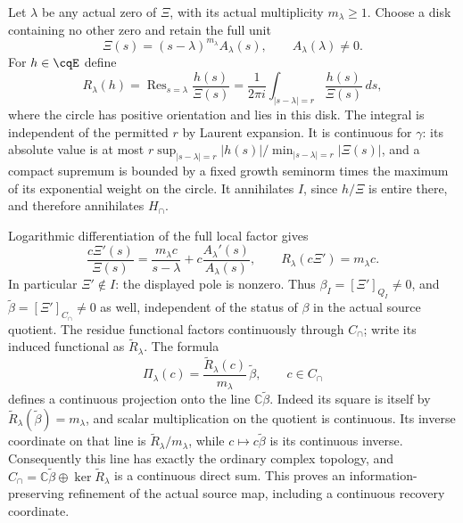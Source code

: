 Let $\lambda$ be any actual zero of $\Xi$, with its actual
multiplicity $m_\lambda\geq1$. Choose a disk containing no other zero
and retain the full unit
\[
 \Xi(s)=(s-\lambda)^{m_\lambda}A_\lambda(s),
 \qquad A_\lambda(\lambda)\ne0.
\]
For $h\in\cqE$ define
\begin{equation}
 R_\lambda(h)
 =\operatorname{Res}_{s=\lambda}\frac{h(s)}{\Xi(s)}
 =\frac1{2\pi i}\int_{|s-\lambda|=r}
                    \frac{h(s)}{\Xi(s)}\,ds ,
 \label{eq:cq-flow-residue-functional}
\end{equation}
where the circle has positive orientation and lies in this disk.
The integral is independent of the permitted $r$ by Laurent
expansion. It is continuous for $\gamma$: its absolute value is
at most $r\sup_{|s-\lambda|=r}|h(s)|/
\min_{|s-\lambda|=r}|\Xi(s)|$, and a compact supremum is bounded
by a fixed growth seminorm times the maximum of its exponential
weight on the circle. It annihilates $I$, since $h/\Xi$ is entire
there, and therefore annihilates $H_\cap$.

Logarithmic differentiation of the full local factor gives
\begin{equation}
 \frac{c\Xi'(s)}{\Xi(s)}
 =\frac{m_\lambda c}{s-\lambda}
        +c\frac{A_\lambda'(s)}{A_\lambda(s)},\qquad
 R_\lambda(c\Xi')=m_\lambda c .
 \label{eq:cq-flow-logarithmic-unit}
\end{equation}
In particular $\Xi'\notin I$: the displayed pole is nonzero.
Thus $\beta_I=[\Xi']_{Q_I}\ne0$, and
$\widetilde\beta=[\Xi']_{C_\cap}\ne0$ as well, independent of the
status of $\beta$ in the actual source quotient.
The residue functional factors continuously through $C_\cap$; write
its induced functional as $\widetilde R_\lambda$.
The formula
\begin{equation}
 \Pi_\lambda(c)
  =\frac{\widetilde R_\lambda(c)}{m_\lambda}\,
                  \widetilde\beta,\qquad c\in C_\cap
 \label{eq:cq-flow-meet-projection}
\end{equation}
defines a continuous projection onto the line
$\mathbb C\widetilde\beta$. Indeed its square is itself by
$\widetilde R_\lambda(\widetilde\beta)=m_\lambda$, and scalar
multiplication on the quotient is continuous. Its inverse coordinate
on that line is $\widetilde R_\lambda/m_\lambda$, while
$c\mapsto c\widetilde\beta$ is its continuous inverse.
Consequently this line has exactly the ordinary complex topology,
and
$C_\cap=\mathbb C\widetilde\beta\oplus
\ker\widetilde R_\lambda$ is a continuous direct sum.
This proves an information-preserving refinement of the actual
source map, including a continuous recovery coordinate.

